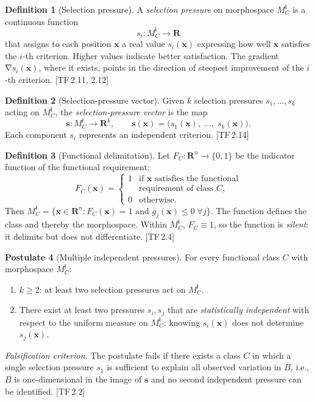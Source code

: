\documentclass[10pt]{article}
\theoremstyle{definition}
\newtheorem{definition}{Definition}[section]
\newtheorem{postulate}[definition]{Postulate}
\theoremstyle{plain}
\theoremstyle{remark}
\newcommand{\MC}{M^{\mathsf{I}}_C}          %
\providecommand{\Rn}{}
\renewcommand{\Rn}{\mathbf{R}^n}            %
\providecommand{\R}{}
\renewcommand{\R}{\mathbf{R}}               %
\DeclareMathOperator{\grad}{\nabla}
\newcommand{\TF}[1]{\textnormal{[TF\,#1]}}  %
\begin{document}
\begin{definition}[Selection pressure]\label{def:2.1}
A \emph{selection pressure} on morphospace $\MC$ is a continuous
function
\[
  s_i : \MC \longrightarrow \R
\]
that assigns to each position $\bm{x}$ a real value $s_i(\bm{x})$
expressing how well $\bm{x}$ satisfies the $i$-th criterion.
Higher values indicate better satisfaction. The gradient
$\grad s_i(\bm{x})$, where it exists, points in the direction of
steepest improvement of the $i$-th criterion. \TF{2.11, 2.12}
\end{definition}

\begin{definition}[Selection-pressure vector]\label{def:2.2}
Given $k$ selection pressures $s_1, \ldots, s_k$ acting on $\MC$,
the \emph{selection-pressure vector} is the map
\[
  \bm{s} : \MC \longrightarrow \R^k, \qquad
  \bm{s}(\bm{x}) = \bigl(s_1(\bm{x}),\; \ldots,\;
  s_k(\bm{x})\bigr).
\]
Each component $s_i$ represents an independent criterion. \TF{2.14}
\end{definition}

\begin{definition}[Functional delimitation]\label{def:2.3}
Let $F_C : \Rn \to \{0, 1\}$ be the indicator function of the
functional requirement:
\[
  F_C(\bm{x}) =
  \begin{cases}
    1 & \text{if } \bm{x} \text{ satisfies the functional}\\
      & \text{requirement of class } C, \\
    0 & \text{otherwise.}
  \end{cases}
\]
Then $\MC = \{\bm{x} \in \Rn : F_C(\bm{x}) = 1 \text{ and }
g_j(\bm{x}) \leq 0 \; \forall j\}$.
The function defines the class and thereby the morphospace.
Within $\MC$, $F_C \equiv 1$, so the function is \emph{silent}:
it delimits but does not differentiate. \TF{2.4}
\end{definition}

\begin{postulate}[Multiple independent pressures]\label{post:2.4}
For every functional class $C$ with morphospace $\MC$:
\begin{enumerate}[label=(\alph*),nosep]
  \item $k \geq 2$: at least two selection pressures act on $\MC$.
  \item There exist at least two pressures $s_i, s_j$ that are
    \emph{statistically independent} with respect to the
    uniform measure on $\MC$: knowing $s_i(\bm{x})$
    does not determine $s_j(\bm{x})$.
\end{enumerate}

\medskip\noindent
\textit{Falsification criterion.}
The postulate fails if there exists a class $C$ in which a single
selection pressure $s_1$ is sufficient to explain all observed variation
in $B$, i.e., $B$ is one-dimensional in the image of $\bm{s}$ and no
second independent pressure can be identified. \TF{2.2}
\end{postulate}
\end{document}
